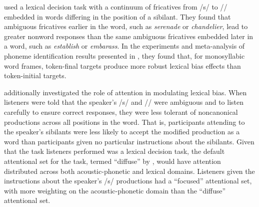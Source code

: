 \citet{Pitt2012} used a lexical decision task with a continuum of fricatives from /s/ to /\textesh/ embedded in words differing in the position of a sibilant.  
They found that ambiguous fricatives earlier in the word, such as \emph{serenade} or \emph{chandelier}, lead to greater nonword responses than the same ambiguous fricatives embedded later in a word, such as \emph{establish} or \emph{embarass}.  
In the experiments and meta-analysis of phoneme identification results presented in \citet{Pitt1993}, they found that, for monosyllabic word frames, token-final targets produce more robust lexical bias effects than token-initial targets.

\citet{Pitt2012} additionally investigated the role of attention in modulating lexical bias.  
When listeners were told that the speaker's /s/ and /\textesh/ were ambiguous and to listen carefully to ensure correct responses, they were less tolerant of noncanonical productions across all positions in the word.  
That is, participants attending to the speaker's sibilants were less likely to accept the modified production as a word than participants given no particular instructions about the sibilants.
Given that the task listeners performed was a lexical decision task, the default attentional set for the task, termed ``diffuse'' by \citet{Pitt2012}, would have attention distributed across both acoustic-phonetic and lexical domains.  Listeners given the instructions about the speaker's /s/ productions had a ``focused'' attentional set, with more weighting on the acoustic-phonetic domain than the ``diffuse'' attentional set.

